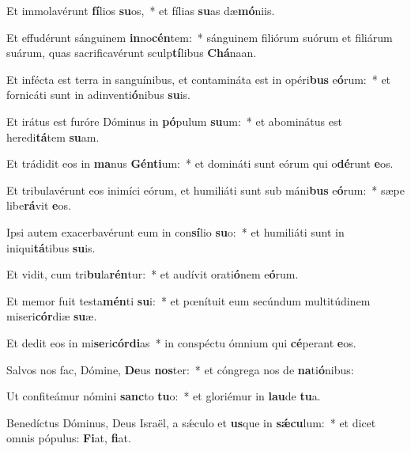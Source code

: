 \item Et immolavérunt \textbf{fí}lios \textbf{su}os,~* et fílias \textbf{su}as dæ\textbf{mó}niis.
\item Et effudérunt sánguinem \textbf{in}no\textbf{cén}tem:~* sánguinem filiórum suórum et filiárum suárum, quas sacrificavérunt sculp\textbf{tí}libus \textbf{Chá}naan.
\item Et infécta est terra in sanguínibus, et contamináta est in opéri\textbf{bus} e\textbf{ó}rum:~* et fornicáti sunt in adinventi\textbf{ó}nibus \textbf{su}is.
\item Et irátus est furóre Dóminus in \textbf{pó}pulum \textbf{su}um:~* et abominátus est heredi\textbf{tá}tem \textbf{su}am.
\item Et trádidit eos in \textbf{ma}nus \textbf{Gén}\textbf{ti}um:~* et domináti sunt eórum qui o\textbf{dé}runt \textbf{e}os.
\item Et tribulavérunt eos inimíci eórum, et humiliáti sunt sub máni\textbf{bus} e\textbf{ó}rum:~* sæpe libe\textbf{rá}vit \textbf{e}os.
\item Ipsi autem exacerbavérunt eum in con\textbf{sí}lio \textbf{su}o:~* et humiliáti sunt in iniqui\textbf{tá}tibus \textbf{su}is.
\item Et vidit, cum tri\textbf{bu}la\textbf{rén}tur:~* et audívit orati\textbf{ó}nem e\textbf{ó}rum.
\item Et memor fuit testa\textbf{mén}ti \textbf{su}i:~* et pœnítuit eum secúndum multitúdinem miseri\textbf{cór}diæ \textbf{su}æ.
\item Et dedit eos in mi\textbf{se}ri\textbf{cór}\textbf{di}as~* in conspéctu ómnium qui \textbf{cé}perant \textbf{e}os.
\item Salvos nos fac, Dómine, \textbf{De}us \textbf{nos}ter:~* et cóngrega nos de \textbf{na}ti\textbf{ó}nibus:
\item Ut confiteámur nómini \textbf{sanc}to \textbf{tu}o:~* et gloriémur in \textbf{lau}de \textbf{tu}a.
\item Benedíctus Dóminus, Deus Israël, a sǽculo et \textbf{us}que in \textbf{sǽ}\textbf{cu}lum:~* et dicet omnis pópulus: \textbf{Fi}at, \textbf{fi}at.
